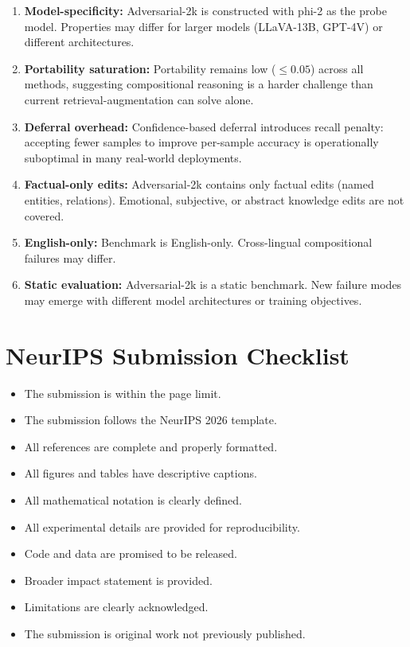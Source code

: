\documentclass[11pt]{article}
\begin{document}
\begin{enumerate}[leftmargin=*,itemsep=2pt]
  \item \textbf{Model-specificity:} Adversarial-2k is constructed with phi-2
    as the probe model. Properties may differ for larger models (LLaVA-13B,
    GPT-4V) or different architectures.
  
  \item \textbf{Portability saturation:} Portability remains low ($\leq 0.05$)
    across all methods, suggesting compositional reasoning is a harder
    challenge than current retrieval-augmentation can solve alone.
  
  \item \textbf{Deferral overhead:} Confidence-based deferral introduces recall
    penalty: accepting fewer samples to improve per-sample accuracy is
    operationally suboptimal in many real-world deployments.
  
  \item \textbf{Factual-only edits:} Adversarial-2k contains only factual edits
    (named entities, relations). Emotional, subjective, or abstract knowledge
    edits are not covered.
  
  \item \textbf{English-only:} Benchmark is English-only. Cross-lingual
    compositional failures may differ.
  
  \item \textbf{Static evaluation:} Adversarial-2k is a static benchmark. New
    failure modes may emerge with different model architectures or training
    objectives.
\end{enumerate}

\section{NeurIPS Submission Checklist}
\label{app:checklist}

\begin{itemize}[leftmargin=*,itemsep=1pt]
  \item[$\boxtimes$] The submission is within the page limit.
  \item[$\boxtimes$] The submission follows the NeurIPS 2026 template.
  \item[$\boxtimes$] All references are complete and properly formatted.
  \item[$\boxtimes$] All figures and tables have descriptive captions.
  \item[$\boxtimes$] All mathematical notation is clearly defined.
  \item[$\boxtimes$] All experimental details are provided for reproducibility.
  \item[$\boxtimes$] Code and data are promised to be released.
  \item[$\boxtimes$] Broader impact statement is provided.
  \item[$\boxtimes$] Limitations are clearly acknowledged.
  \item[$\boxtimes$] The submission is original work not previously published.
\end{itemize}
\end{document}
